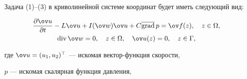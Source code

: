 Задача (1)--(3) в криволинейной системе координат будет иметь следующий вид:


\begin{gather}


\frac{\partial {\ov u}}{\partial t}-L\ov u+I(\ov w)\ov


u+C\overline\grad\, p=\ov f(z),\quad z\in\Omega,\\


%


\Div \ov w=0,\quad z\in\Omega,\quad \ov u(z)=0,\quad z\in\Gamma,


\end{gather}


где $\ov u=(u_1,u_2)^\top$ --- искомая вектор-функция скорости,


$p$ --- искомая скалярная функция давления,


